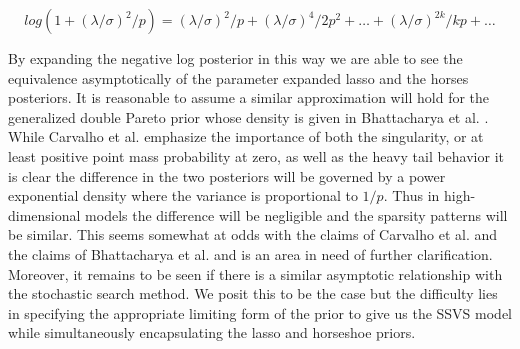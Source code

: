 \begin{equation}\label{eqn:taylor_log_one_plus_x}
log\left(1+(\lambda/\sigma)^2/p\right) = (\lambda/\sigma)^2/p + (\lambda/\sigma)^4/2p^2 + \dots+ (\lambda/\sigma)^{2k}/kp + \dots
\end{equation}

By expanding the negative log posterior in this way we are able to see the equivalence asymptotically of the parameter expanded lasso and the horses posteriors. It is reasonable to assume a similar approximation will hold for the generalized double Pareto prior  whose density is given in Bhattacharya et al. \cite{bhattacharya2012bayesian}. While Carvalho et al. \cite{carvalho2010horseshoe} emphasize the importance of both the singularity, or at least positive point mass probability at zero, as well as the heavy tail behavior it is clear the difference in the two posteriors will be governed by a power exponential density where the variance is proportional to $1/p$. Thus in high-dimensional models the difference will be negligible and the sparsity patterns will be similar. This seems somewhat at odds with the claims of Carvalho et al. and the claims of Bhattacharya et al. and is an area in need of further clarification. Moreover, it remains to be seen if there is a similar asymptotic relationship with the stochastic search method. We posit this to be the case but the difficulty lies in specifying the appropriate limiting form of the prior to give us the SSVS model while simultaneously encapsulating the lasso and horseshoe priors. 



 